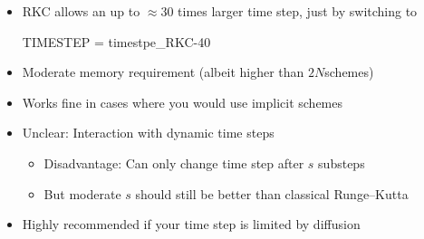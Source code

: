 \documentclass[\mydriver,12pt,twoside,notitlepage]{article}
\newcommand{\BoxLabel}[1]{\fbox{\rmfamily\emph{#1}}}
\newcommand{\ColEmph}[1]{{\color{DarkishRed}#1}}
\newcommand{\colEmph}[1]{{\color{DarkishBlue}#1}}
\begin{document}
\begin{itemize}

\item RKC allows an up to $\approx 30$ times larger time step, just by
  switching to\\
{\small\color{DarkBlue}
\begin{CodeVerbatim}[label=\BoxLabel{Makefile.local}]
  TIMESTEP = timestpe_RKC-40
\end{CodeVerbatim}
}
\item \colEmph{Moderate memory requirement}
  (albeit higher than $2N$schemes)

\item Works fine in cases where you would use implicit schemes

\item Unclear: Interaction with dynamic time steps
  \begin{itemize}
  \item Disadvantage: Can only change time step after $s$ substeps
  \item But moderate $s$ should still be better than classical
    Runge--Kutta
  \end{itemize}

\item \ColEmph{Highly recommended} if your time step is limited by diffusion

\end{itemize}




\end{document}
